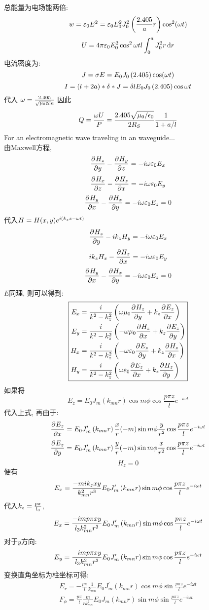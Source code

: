 \documentclass[UTF8,9pt]{ctexart}
\begin{document}
总能量为电场能两倍:
$$w = \varepsilon_0E^2 = \varepsilon_0E_0^2J_{0}^2\left(\frac{2.405}{a} r\right) \cos^2(\omega t)$$
$$U = 4\pi\varepsilon_0 E_0^2\cos^2\omega tl\int_0^aJ_0^2r\mathop{}\!\mathrm{d} r$$
电流密度为:
$$J=\sigma E = E_{0} J_{0}\left(2.405\right) \cos(\omega t)$$
$$I = (l+2a)*\delta*J = \delta lE_0J_0\left(2.405\right)\cos\omega t$$
代入
$\omega = \frac{2.405}{\sqrt{\mu_0\varepsilon_0}a}$
因此
$$Q=\frac{\omega U}{P} = \frac{2.405 \sqrt{\mu_{0} / \epsilon_{0}}}{2 R_{S}} \frac{1}{1+a / l}$$
For an electromagnetic wave traveling in an waveguide...\\
由Maxwell方程, 
$$\frac{\partial^{} H_z}{\partial {y}^{}}-\frac{\partial^{} H_y}{\partial {z}^{}}=-i\omega \varepsilon_0 E_x$$
$$\frac{\partial^{} H_x}{\partial {z}^{}}-\frac{\partial^{} H_z}{\partial {x}^{}}=-i\omega \varepsilon_0 E_y$$
$$\frac{\partial^{} H_y}{\partial {x}^{}}-\frac{\partial^{} H_x}{\partial {y}^{}}=-i\omega \varepsilon_0 E_z = 0$$
代入$H=H(x,y)e^{i(k_zz-\omega t)}$
$$\frac{\partial^{} H_z}{\partial {y}^{}}-ik_zH_y=-i\omega \varepsilon_0 E_x$$
$$ik_zH_x-\frac{\partial^{} H_z}{\partial {x}^{}}=-i\omega \varepsilon_0 E_y$$
$$\frac{\partial^{} H_y}{\partial {x}^{}}-\frac{\partial^{} H_x}{\partial {y}^{}}=-i\omega \varepsilon_0 E_z = 0$$
$E$同理, 则可以得到:
$$\boxed{\begin{aligned} 
    E_x &= \frac{i}{k^2-k_z^2}\left( \omega \mu_0\frac{\partial^{} H_z}{\partial {y}^{}}+k_z\frac{\partial^{} E_z}{\partial {x}^{}} \right)\\
    E_y &= \frac{i}{k^2-k_z^2}\left( -\omega \mu_0\frac{\partial^{} H_z}{\partial {x}^{}}+k_z\frac{\partial^{} E_z}{\partial {y}^{}} \right)\\
    H_x &= \frac{i}{k^2-k_z^2}\left( -\omega \varepsilon_0\frac{\partial^{} E_z}{\partial {y}^{}}+k_z\frac{\partial^{} H_z}{\partial {x}^{}} \right)\\
    H_y &= \frac{i}{k^2-k_z^2}\left( \omega \varepsilon_0\frac{\partial^{} E_z}{\partial {x}^{}}+k_z\frac{\partial^{} H_z}{\partial {y}^{}} \right)
 \end{aligned}}$$
如果将$$ 
E_z=E_{0} J_{m}\left(k_{m n} r\right) \cos m \phi \cos \frac{p \pi z}{l} e^{-i \omega t}
 $$代入上式, 
再由于:
$$\frac{\partial^{} E_z}{\partial {x}^{}} = E_{0} J'_{m}\left(k_{m n} r\right)\frac{x}{r}(-m) \sin m \phi\frac{y}{r^2} \cos \frac{p \pi z}{l} e^{-i \omega t}$$
$$\frac{\partial^{} E_z}{\partial {y}^{}} = E_{0} J'_{m}\left(k_{m n} r\right)\frac{y}{r}(-m) \sin m \phi\frac{x}{r^2} \cos \frac{p \pi z}{l} e^{-i \omega t}$$
$$H_z=0$$
便有
$$E_x=\frac{-mik_zxy}{k_{mn}^2r^3}E_{0} J'_{m}\left(k_{m n} r\right) \sin m \phi \cos \frac{p \pi z}{l} e^{-i \omega t}$$
代入$k_z=\frac{p\pi}{l_3}$,
$$E_x=\frac{-imp\pi xy}{l_3k_{mn}^2r^3}E_{0} J'_{m}\left(k_{m n} r\right) \sin m \phi \cos \frac{p \pi z}{l} e^{-i \omega t}$$
对于$y$方向:
$$E_y=\frac{-imp\pi xy}{l_3k_{mn}^2r^3}E_{0} J'_{m}\left(k_{m n} r\right) \sin m \phi \cos \frac{p \pi z}{l} e^{-i \omega t}$$
变换直角坐标为柱坐标可得:
$$ \boxed{
\begin{array}{l}{E_{r}=-\frac{p \pi}{l} \frac{1}{k_{m n}} E_{0} J_{m}^{\prime}\left(k_{m n} r\right) \cos m \phi \sin \frac{p \pi z}{l} e^{-i \omega t}} \\ {F_{\phi}=\frac{p \pi}{l} \frac{m}{r k_{m n}^{2}} E_{0} J_{m}\left(k_{m n} r\right) \sin m \phi \sin \frac{p \pi z}{l} e^{-i \omega t}}\end{array}
 }$$
\end{document}
